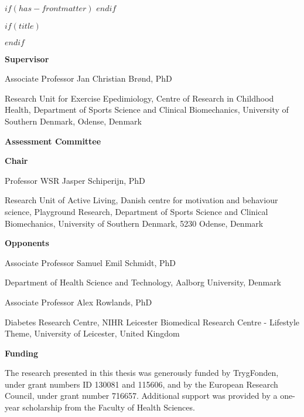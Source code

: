 $if(has-frontmatter)$
  \frontmatter
$endif$
  
  $if(title)$
  \maketitle
$endif$




\newpage

\textsf{\textbf{\Large{Supervisor}}}

\vspace*{\baselineskip}

Associate Professor Jan Christian Brønd, PhD

Research Unit for Exercise Epedimiology, Centre of Research in Childhood Health, Department of Sports Science and Clinical Biomechanics, University of Southern Denmark, Odense, Denmark

\vspace{2cm}

\textsf{\textbf{\Large{Assessment Committee}}}

\vspace*{\baselineskip}

\textbf{Chair}

Professor WSR Jasper Schiperijn, PhD

Research Unit of Active Living, Danish centre for motivation and behaviour science, Playground Research, Department of Sports Science and Clinical Biomechanics, University of Southern Denmark, 5230 Odense, Denmark

\textbf{Opponents}

Associate Professor Samuel Emil Schmidt, PhD

Department of Health Science and Technology, Aalborg University, Denmark

Associate Professor Alex Rowlands, PhD

Diabetes Research Centre, NIHR Leicester Biomedical Research Centre - Lifestyle Theme, University of Leicester, United Kingdom

\vspace{2cm}

\textsf{\textbf{\Large{Funding}}}

\vspace*{\baselineskip}

The research presented in this thesis was generously funded by TrygFonden, under grant numbers ID 130081 and 115606, and by the European Research Council, under grant number 716657. Additional support was provided by a one-year scholarship from the Faculty of Health Sciences.

